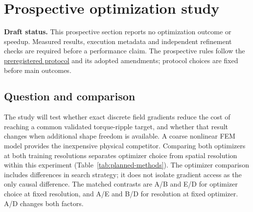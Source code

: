 
\section{Prospective optimization study}
\label{sec:prospective-optimization}

\noindent\textbf{Draft status.}
This prospective section reports no optimization outcome or speedup.
Measured results, execution metadata and independent refinement checks are
required before a performance claim. The prospective rules follow the
\href{https://github.com/rjwalters/geode-fem/issues/1185}{preregistered protocol}
and its adopted amendments; protocol choices are fixed before main outcomes.

\subsection{Question and comparison}

The study will test whether exact discrete field gradients reduce the cost of
reaching a common validated torque-ripple target, and whether that result
changes when additional shape freedom is available. A coarse nonlinear FEM
model provides the inexpensive physical competitor. Comparing both optimizers
at both training resolutions separates optimizer choice from spatial
resolution within this experiment (Table~\ref{tab:planned-methods}). The
optimizer comparison includes differences in search strategy; it does not
isolate gradient access as the only causal difference. The matched contrasts
are A/B and E/D for optimizer choice at fixed resolution, and A/E and B/D
for resolution at fixed optimizer. A/D changes both factors.


